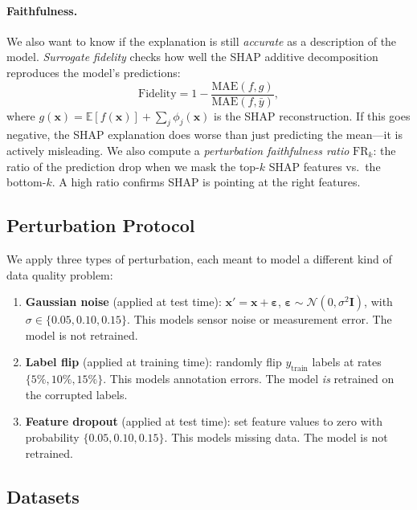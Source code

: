 \documentclass[10pt,twocolumn]{article}
\begin{document}
\paragraph{Faithfulness.}
We also want to know if the explanation is still \emph{accurate} as
a description of the model. \emph{Surrogate fidelity} checks how
well the SHAP additive decomposition reproduces the model's
predictions:
\begin{equation}\label{eq:fidelity}
  \text{Fidelity} = 1 - \frac{\text{MAE}(f, g)}
                              {\text{MAE}(f, \bar{y})},
\end{equation}
where $g(\mathbf{x}) = \mathbb{E}[f(\mathbf{x})] + \sum_j
\phi_j(\mathbf{x})$ is the SHAP reconstruction. If this goes
negative, the SHAP explanation does worse than just predicting the
mean---it is actively misleading. We also compute a
\emph{perturbation faithfulness ratio} $\text{FR}_k$: the ratio of
the prediction drop when we mask the top-$k$ SHAP features vs.\
the bottom-$k$. A high ratio confirms SHAP is pointing at the
right features.

\subsection{Perturbation Protocol}\label{sec:perturbation}

We apply three types of perturbation, each meant to model a
different kind of data quality problem:
\begin{enumerate}[leftmargin=*,topsep=2pt,itemsep=1pt]
  \item \textbf{Gaussian noise} (applied at test time):
    $\mathbf{x}' = \mathbf{x} + \boldsymbol\varepsilon$,
    $\boldsymbol\varepsilon \sim \mathcal{N}(0,\sigma^2\mathbf{I})$,
    with $\sigma \in \{0.05, 0.10, 0.15\}$. This models sensor
    noise or measurement error. The model is not retrained.
  \item \textbf{Label flip} (applied at training time): randomly
    flip $y_{\text{train}}$ labels at rates $\{5\%, 10\%, 15\%\}$.
    This models annotation errors. The model \emph{is} retrained
    on the corrupted labels.
  \item \textbf{Feature dropout} (applied at test time): set
    feature values to zero with probability
    $\{0.05, 0.10, 0.15\}$. This models missing data. The model is
    not retrained.
\end{enumerate}

\subsection{Datasets}\label{sec:datasets}
\end{document}
